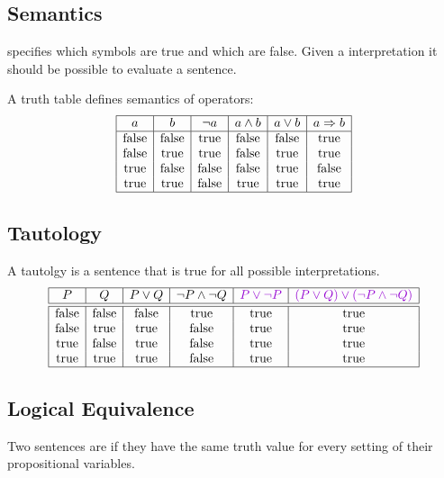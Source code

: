 \documentclass[
../EiKI_Summary.tex,
]
{subfiles}
\begin{document}
\subsection{Semantics}
 specifies which symbols are true and which are false. Given a interpretation it should be possible to evaluate a sentence. 

A truth table defines semantics of operators:
\[
\begin{array}{|c|c|c|c|c|c|}
\hline
a & b & \neg a & a \land b & a \lor b & a \Rightarrow b \\
\hline
\text{false} & \text{false} & \text{true} & \text{false} & \text{false} & \text{true} \\
\text{false} & \text{true} & \text{true} & \text{false} & \text{true} & \text{true} \\
\text{true} & \text{false} & \text{false} & \text{false} & \text{true} & \text{false} \\
\text{true} & \text{true} & \text{false} & \text{true} & \text{true} & \text{true} \\
\hline
\end{array}
\]

\subsection{Tautology}
A tautolgy is a sentence that is true for all possible interpretations.
\[
\begin{array}{|c|c|c|c|c|c|}
\hline
P & Q & P \lor Q & \neg P \land \neg Q & \text{\defc{$P \lor \neg P$}} & \text{\defc{$(P \lor Q) \lor (\neg P \land \neg Q)$}} \\
\hline\hline
\text{false} & \text{false} & \text{false} & \text{true} & \text{true} & \text{true} \\
\text{false} & \text{true} & \text{true} & \text{false} & \text{true} & \text{true} \\
\text{true} & \text{false} & \text{true} & \text{false} & \text{true} & \text{true} \\
\text{true} & \text{true} & \text{true} & \text{false} & \text{true} & \text{true} \\
\hline
\end{array}
\]


\subsection{Logical Equivalence}
Two sentences are  if they have the same truth value for every setting of their propositional variables.
\end{document}

